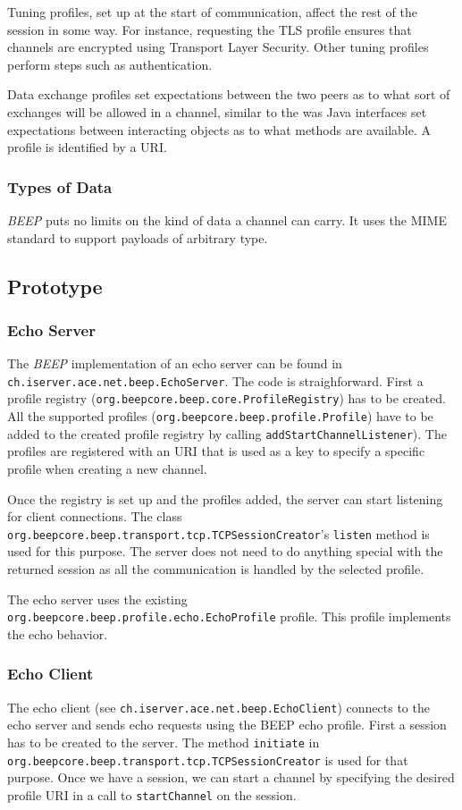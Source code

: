 Tuning profiles, set up at the start of communication, affect the rest of the session in some way. For instance, requesting the TLS profile ensures that channels are encrypted using Transport Layer Security. Other tuning profiles perform steps such as authentication.

Data exchange profiles set expectations between the two peers as to what sort of exchanges will be allowed in a channel, similar to the was Java interfaces set expectations between interacting objects as to what methods are available. A profile is identified by a URI.

\subsubsection{Types of Data}
\emph{BEEP} puts no limits on the kind of data a channel can carry. It uses the MIME standard to support payloads of arbitrary type.


\subsection{Prototype}
\subsubsection{Echo Server}
The \emph{BEEP} implementation of an echo server can be found in \texttt{ch.iserver.ace.net.beep.EchoServer}. The code is straighforward. First a profile registry (\texttt{org.beepcore.beep.core.ProfileRegistry}) has to be created. All the supported profiles (\texttt{org.beepcore.beep.profile.Profile}) have to be added to the created profile registry by calling \texttt{addStartChannelListener}). The profiles are registered with an URI that is used as a key to specify a specific profile when creating a new channel.

Once the registry is set up and the profiles added, the server can start listening for client connections. The class \texttt{org.beepcore.beep.transport.tcp.TCPSessionCreator}'s \texttt{listen} method is used for this purpose. The server does not need to do anything special with the returned session as all the communication is handled by the selected profile.

The echo server uses the existing \texttt{org.beepcore.beep.profile.echo.EchoProfile} profile. This profile implements the echo behavior.

\subsubsection{Echo Client}
The echo client (see \texttt{ch.iserver.ace.net.beep.EchoClient}) connects to the echo server and sends echo requests using the BEEP echo profile. First a session has to be created to the server. The method \texttt{initiate} in \texttt{org.beepcore.beep.transport.tcp.TCPSessionCreator} is used for that purpose. Once we have a session, we can start a channel by specifying the desired profile URI in a call to \texttt{startChannel} on the session.

